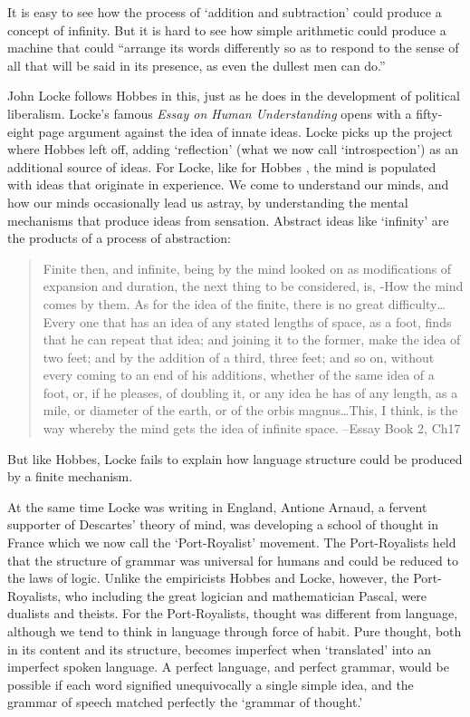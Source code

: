 It is easy to see how the process of `addition and subtraction' could produce a concept of infinity. But it is hard to see how simple arithmetic could produce a machine that could “arrange its words differently so as to respond to the sense of all that will be said in its presence, as even the dullest men can do.”

John Locke follows Hobbes in this, just as he does in the development of political liberalism. Locke’s famous \emph{Essay on Human Understanding} opens with a fifty-eight page argument against the idea of innate ideas. Locke picks up the project where Hobbes left off, adding `reflection' (what we now call `introspection') as an additional source of ideas. For Locke, like for Hobbes , the mind is populated with ideas that originate in experience. We come to understand our minds, and how our minds occasionally lead us astray, by understanding the mental mechanisms that produce ideas from sensation. Abstract ideas like `infinity' are the products of a process of abstraction:

\begin{quote}

Finite then, and infinite, being by the mind looked on as modifications of expansion and duration, the next thing to be considered, is, -How the mind comes by them. As for the idea of the finite, there is no great difficulty{\ldots}Every one that has an idea of any stated lengths of space, as a foot, finds that he can repeat that idea; and joining it to the former, make the idea of two feet; and by the addition of a third, three feet; and so on, without every coming to an end of his additions, whether of the same idea of a foot, or, if he pleases, of doubling it, or any idea he has of any length, as a mile, or diameter of the earth, or of the orbis magnus{\ldots}This, I think, is the way whereby the mind gets the idea of infinite space. --Essay Book 2, Ch17
\end{quote}

But like Hobbes, Locke fails to explain how language structure could be produced by a finite mechanism.

At the same time Locke was writing in England, Antione Arnaud, a fervent supporter of Descartes' theory of mind, was developing a school of thought in France which we now call the `Port-Royalist' movement. The Port-Royalists held that the structure of grammar was universal for humans and could be reduced to the laws of logic. Unlike the empiricists Hobbes and Locke, however, the Port-Royalists, who including the great logician and mathematician Pascal, were dualists and theists. For the Port-Royalists, thought was different from language, although we tend to think in language through force of habit. Pure thought, both in its content and its structure, becomes imperfect when `translated' into an imperfect spoken language. A perfect language, and perfect grammar, would be possible if each word signified unequivocally a single simple idea, and the grammar of speech matched perfectly the `grammar of thought.' 

